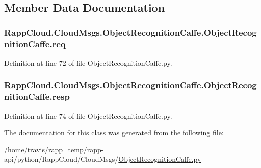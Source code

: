 \subsection{Member Data Documentation}
\hypertarget{classRappCloud_1_1CloudMsgs_1_1ObjectRecognitionCaffe_1_1ObjectRecognitionCaffe_a5298d34c830c9944a766683985b9d36a}{
\subsubsection[{req}]{\setlength{\rightskip}{0pt plus 5cm}Rapp\-Cloud.\-Cloud\-Msgs.\-Object\-Recognition\-Caffe.\-Object\-Recognition\-Caffe.\-req}}\label{classRappCloud_1_1CloudMsgs_1_1ObjectRecognitionCaffe_1_1ObjectRecognitionCaffe_a5298d34c830c9944a766683985b9d36a}


Definition at line 72 of file Object\-Recognition\-Caffe.\-py.

\hypertarget{classRappCloud_1_1CloudMsgs_1_1ObjectRecognitionCaffe_1_1ObjectRecognitionCaffe_a475791974e5352ed431c0cb2f88585e2}{
\subsubsection[{resp}]{\setlength{\rightskip}{0pt plus 5cm}Rapp\-Cloud.\-Cloud\-Msgs.\-Object\-Recognition\-Caffe.\-Object\-Recognition\-Caffe.\-resp}}\label{classRappCloud_1_1CloudMsgs_1_1ObjectRecognitionCaffe_1_1ObjectRecognitionCaffe_a475791974e5352ed431c0cb2f88585e2}


Definition at line 74 of file Object\-Recognition\-Caffe.\-py.



The documentation for this class was generated from the following file\-:\begin{DoxyCompactItemize}
\item 
/home/travis/rapp\-\_\-temp/rapp-\/api/python/\-Rapp\-Cloud/\-Cloud\-Msgs/\hyperlink{ObjectRecognitionCaffe_8py}{Object\-Recognition\-Caffe.\-py}\end{DoxyCompactItemize}
